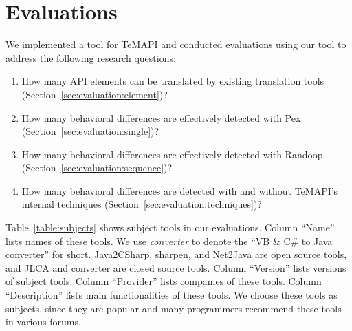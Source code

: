 
\section{Evaluations}
\label{sec:evaluation}

We implemented a tool for TeMAPI and conducted evaluations using our tool to address the following research questions:

\begin{enumerate}
\item How many API elements can be translated by existing translation tools (Section~\ref{sec:evaluation:element})? %
\item How many behavioral differences are effectively detected with Pex (Section~\ref{sec:evaluation:single})?%
\item How many behavioral differences are effectively detected with Randoop (Section~\ref{sec:evaluation:sequence})?%
\item How many behavioral differences are detected with and without TeMAPI's internal techniques (Section~\ref{sec:evaluation:techniques})?
\end{enumerate}%

Table~\ref{table:subjects} shows subject tools in our evaluations. Column ``Name'' lists names of these tools. We use \emph{converter} to denote the ``VB \& C\# to Java converter'' for short. Java2CSharp, sharpen, and Net2Java are open source tools, and JLCA and converter are closed source tools. Column ``Version'' lists versions of subject tools. Column ``Provider'' lists companies of these tools. Column ``Description'' lists main functionalities of these tools. We choose these tools as subjects, since they are popular and many programmers recommend these tools in various forums.

